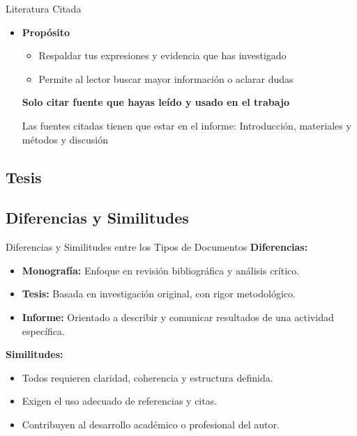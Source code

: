 \documentclass[
11pt, %
]{beamer}
\begin{document}
\begin{frame}{Literatura Citada}
	\begin{itemize}
		\item \textbf{Propósito}
		      \begin{itemize}
			      \item Respaldar tus expresiones y evidencia que has investigado
			      \item Permite al lector buscar mayor información o aclarar dudas
		      \end{itemize}
		      \textbf{Solo citar fuente que hayas leído y usado en el trabajo}

		      Las fuentes citadas tienen que estar en el informe: Introducción, materiales y
		      métodos y discusión
	\end{itemize}
\end{frame}

\subsection{Tesis}

\subsection{Diferencias y Similitudes}

\begin{frame}{Diferencias y Similitudes entre los Tipos de Documentos}
	\textbf{Diferencias:}
	\begin{itemize}
		\item \textbf{Monografía:} Enfoque en revisión bibliográfica y análisis crítico.
		\item \textbf{Tesis:} Basada en investigación original, con rigor metodológico.
		\item \textbf{Informe:} Orientado a describir y comunicar resultados de una actividad específica.
	\end{itemize}
	\textbf{Similitudes:}
	\begin{itemize}
		\item Todos requieren claridad, coherencia y estructura definida.
		\item Exigen el uso adecuado de referencias y citas.
		\item Contribuyen al desarrollo académico o profesional del autor.
	\end{itemize}
\end{frame}
\end{document}
